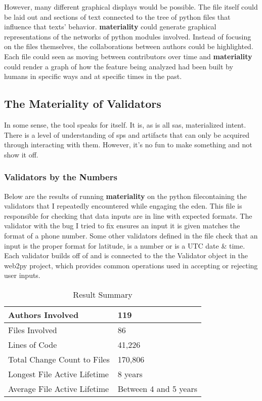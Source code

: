 \documentclass[a4paper,man,natbib,floatsintext]{apa6}
\begin{document}
  However, many different graphical displays would be possible. The file itself could be laid out and sections of text connected to the tree of python files that influence that texts' behavior. \textbf{materiality} could generate graphical representations of the networks of \Gls{python} modules involved. Instead of focusing on the files themselves, the collaborations between authors could be highlighted. Each file could seen as moving between contributors over time and \textbf{materiality} could render a graph of how the feature being analyzed had been built by humans in specific ways and at specific times in the past.

  \subsection{The Materiality of Validators}
  In some sense, the tool speaks for itself. It is, as is all \glspl{sa}, materialized intent. There is a level of understanding of \glspl{sp} and artifacts that can only be acquired through interacting with them. However, it's no fun to make something and not show it off.

  \subsubsection{Validators by the Numbers}
  Below are the results of running \textbf{materiality} on the \Gls{python} file\footnotemark containing the validators that I repeatedly encountered while engaging the \acrshort{eden}. This file is responsible for checking that data inputs are in line with expected formats. The validator with the bug I tried to fix ensures an input it is given matches the format of a phone number. Some other validators defined in the file check that an input is the proper format for latitude, is a number or is a UTC date \& time. Each validator builds off of and is connected to the the Validator object in the web2py project, which provides common operations used in accepting or rejecting user inputs.


  \begin{table}[ht]
  \caption{Result Summary}
  \label{tab:result-summary}
  \begin{tabular}{|l|l|}
  \hline
  Authors Involved               & 119                                   \\ \hline
  Files Involved                 & 86                                    \\ \hline
  Lines of Code                  & 41,226                                \\ \hline
  Total Change Count to Files    & 170,806                               \\ \hline
  Longest File Active Lifetime   & 8 years                               \\ \hline
  Average File Active Lifetime   & Between 4 and 5 years                 \\ \hline
  \end{tabular}
\end{table}
  
\end{document}
